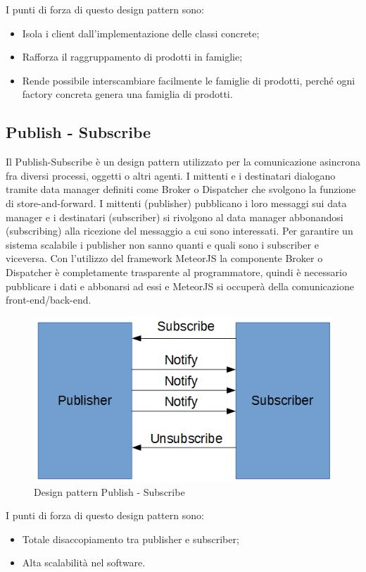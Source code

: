 I punti di forza di questo design pattern sono:
\begin{itemize}
	\item Isola i client dall’implementazione delle classi concrete;
	\item Rafforza il raggruppamento di prodotti in famiglie;
	\item Rende possibile interscambiare facilmente le famiglie di prodotti, perché ogni factory concreta genera una famiglia di prodotti.
\end{itemize}


\subsection{Publish - Subscribe}
Il Publish-Subscribe è un design pattern utilizzato per la comunicazione asincrona fra diversi processi, oggetti o altri agenti. I mittenti e i destinatari dialogano tramite data manager definiti come Broker o Dispatcher che svolgono la funzione di store-and-forward.
I mittenti (publisher) pubblicano i loro messaggi sui data manager e i destinatari (subscriber) si rivolgono al data manager abbonandosi (subscribing) alla ricezione del messaggio a cui sono interessati. Per garantire un sistema scalabile i publisher non sanno quanti e quali sono i subscriber e viceversa. 
Con l'utilizzo del framework MeteorJS la componente Broker o Dispatcher è completamente trasparente al programmatore, quindi è necessario pubblicare i dati e abbonarsi ad essi e MeteorJS si occuperà della comunicazione front-end/back-end.
\begin{figure}[H]
	\centering
	\includegraphics[width=0.5\linewidth]{IMG/pubsub}
	\caption{Design pattern Publish - Subscribe}
\end{figure}

I punti di forza di questo design pattern sono:
\begin{itemize}
	\item Totale disaccopiamento tra publisher e subscriber;
	\item Alta scalabilità nel software.
\end{itemize}


